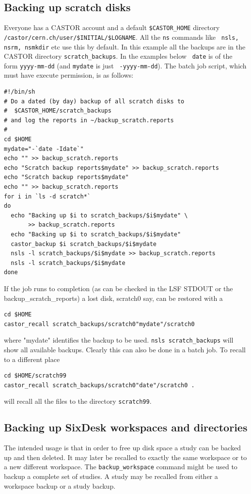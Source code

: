 \documentclass{cernatsnote}
\begin{document}
\subsection{Backing up scratch disks}
Everyone has a CASTOR account and a default \texttt{\$CASTOR\_HOME} directory {\tt
/castor/cern.ch/user/\$INITIAL/\$LOGNAME}. All the \texttt{ns} commands like {\tt
nsls, nsrm, nsmkdir} etc use this by default. In this example all the backups
are in the CASTOR directory \texttt{scratch\_backups}.  In the examples below {\tt
date} is of the form \texttt{yyyy-mm-dd} (and \texttt{mydate} is just {\tt
-yyyy-mm-dd}).  The batch job script, which must have execute permission, is as
follows:
\begin{verbatim}
#!/bin/sh
# Do a dated (by day) backup of all scratch disks to 
#  $CASTOR_HOME/scratch_backups
# and log the reports in ~/backup_scratch.reports
#
cd $HOME
mydate="-`date -Idate`"
echo "" >> backup_scratch.reports
echo "Scratch backup reports$mydate" >> backup_scratch.reports
echo "Scratch backup reports$mydate"
echo "" >> backup_scratch.reports
for i in `ls -d scratch*`
do
  echo "Backing up $i to scratch_backups/$i$mydate" \
       >> backup_scratch.reports
  echo "Backing up $i to scratch_backups/$i$mydate"
  castor_backup $i scratch_backups/$i$mydate
  nsls -l scratch_backups/$i$mydate >> backup_scratch.reports
  nsls -l scratch_backups/$i$mydate
done
\end{verbatim}

If the job runs to completion (as can be checked in the LSF STDOUT or the
backup\_scratch\_reports) a lost disk, scratch0 say, can be restored with a
\begin{verbatim}
cd $HOME
castor_recall scratch_backups/scratch0"mydate"/scratch0
\end{verbatim}
where "mydate" identifies the backup to be used. \texttt{nsls scratch\_backups}
will show all available backups. Clearly this can also be done in a batch job.
To recall to a different place
\begin{verbatim}
cd $HOME/scratch99
castor_recall scratch_backups/scratch0"date"/scratch0 .
\end{verbatim}
will recall all the files to the directory \texttt{scratch99}.

\subsection{Backing up SixDesk workspaces and directories}
The intended usage is that in order to free up disk space a study can be backed
up and then deleted. It may later be recalled to exactly the same workspace or
to a new different workspace. The \texttt{backup\_workspace} command might be
used to backup a complete set of studies. A study may be recalled from either a
workspace backup or a study backup.
\end{document}
